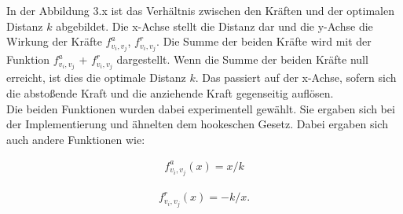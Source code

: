 In der Abbildung 3.x ist das Verhältnis zwischen den Kräften und der optimalen Distanz $k$ abgebildet. Die x-Achse stellt die Distanz dar und die y-Achse die Wirkung der Kräfte $f^{a}_{v_{i},v_{j}}$, $f^{r}_{v_{i},v_{j}}$. Die Summe der beiden Kräfte wird mit der Funktion $f^{a}_{v_{i},v_{j}}$ + $f^{r}_{v_{i},v_{j}}$ dargestellt. Wenn die Summe der beiden Kräfte null erreicht, ist dies die optimale Distanz $k$. Das passiert auf der x-Achse, sofern sich die abstoßende Kraft und die anziehende Kraft gegenseitig auflösen. \\

Die beiden Funktionen wurden dabei experimentell gewählt. Sie ergaben sich bei der Implementierung und ähnelten dem hookeschen Gesetz. Dabei ergaben sich auch andere Funktionen wie:

\begin{align}
f^{a}_{v_{i},v_{j}} (x) =
x/k
\end{align}

\begin{align}
f^{r}_{v_{i},v_{j}} (x) =
-k/x.
\end{align}

